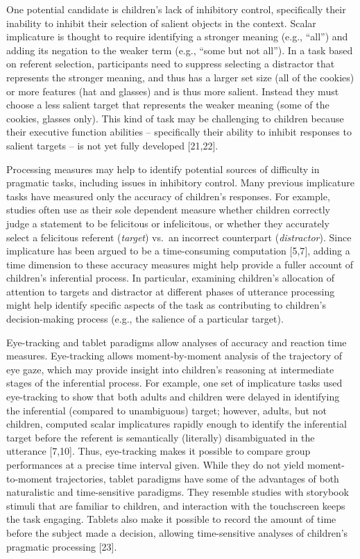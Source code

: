\documentclass{rsos}
\begin{document}
One potential candidate is children's lack of inhibitory control,
specifically their inability to inhibit their selection of salient
objects in the context. Scalar implicature is thought to require
identifying a stronger meaning (e.g., ``all'') and adding its negation
to the weaker term (e.g., ``some but not all''). In a task based on
referent selection, participants need to suppress selecting a distractor
that represents the stronger meaning, and thus has a larger set size
(all of the cookies) or more features (hat and glasses) and is thus more
salient. Instead they must choose a less salient target that represents
the weaker meaning (some of the cookies, glasses only). This kind of
task may be challenging to children because their executive function
abilities -- specifically their ability to inhibit responses to salient
targets -- is not yet fully developed {[}21,22{]}.

Processing measures may help to identify potential sources of difficulty
in pragmatic tasks, including issues in inhibitory control. Many
previous implicature tasks have measured only the accuracy of children's
responses. For example, studies often use as their sole dependent
measure whether children correctly judge a statement to be felicitous or
infelicitous, or whether they accurately select a felicitous referent
(\emph{target}) vs.~an incorrect counterpart (\emph{distractor}). Since
implicature has been argued to be a time-consuming computation
{[}5,7{]}, adding a time dimension to these accuracy measures might help
provide a fuller account of children's inferential process. In
particular, examining children's allocation of attention to targets and
distractor at different phases of utterance processing might help
identify specific aspects of the task as contributing to children's
decision-making process (e.g., the salience of a particular target).

Eye-tracking and tablet paradigms allow analyses of accuracy and
reaction time measures. Eye-tracking allows moment-by-moment analysis of
the trajectory of eye gaze, which may provide insight into children's
reasoning at intermediate stages of the inferential process. For
example, one set of implicature tasks used eye-tracking to show that
both adults and children were delayed in identifying the inferential
(compared to unambiguous) target; however, adults, but not children,
computed scalar implicatures rapidly enough to identify the inferential
target before the referent is semantically (literally) disambiguated in
the utterance {[}7,10{]}. Thus, eye-tracking makes it possible to
compare group performances at a precise time interval given. While they
do not yield moment-to-moment trajectories, tablet paradigms have some
of the advantages of both naturalistic and time-sensitive paradigms.
They resemble studies with storybook stimuli that are familiar to
children, and interaction with the touchscreen keeps the task engaging.
Tablets also make it possible to record the amount of time before the
subject made a decision, allowing time-sensitive analyses of children's
pragmatic processing {[}23{]}.
\end{document}
